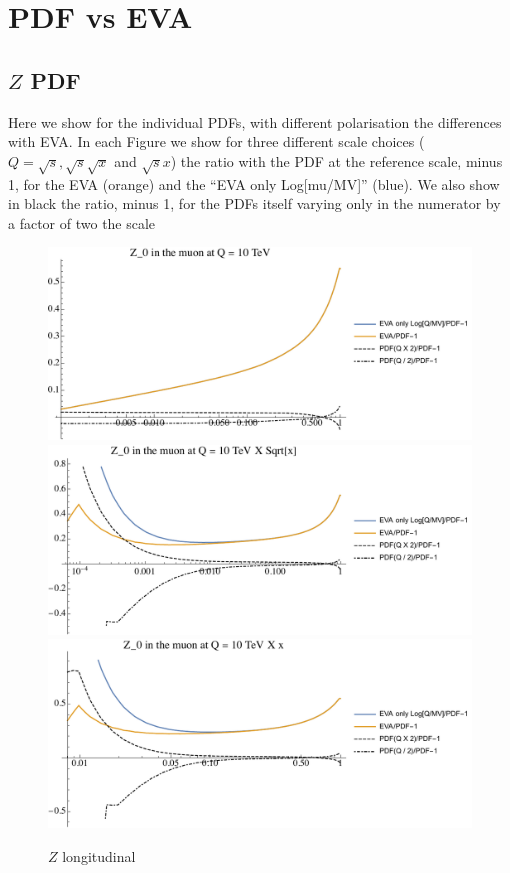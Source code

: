 \documentclass[a4paper,11pt]{article}
\begin{document}
\clearpage

\section{PDF vs EVA}
\label{app:PDFsEVA}

\subsection{$Z$ PDF}
\label{app:PDFsEVA_Z}


Here we show for the individual PDFs, with different polarisation the differences with EVA. In each Figure we show for three different scale choices ($Q=\sqrt{s}, \sqrt{s} \sqrt{x}$ and $\sqrt{s} x$) the ratio with the PDF at the reference scale, minus 1, for the EVA (orange) and the ``EVA only Log[mu/MV]'' (blue). We also show in black the ratio, minus 1, for the PDFs itself varying only in the numerator by a factor of two the scale



\begin{figure}[!b]
\includegraphics[width=0.46\linewidth]{Notebooks/PlotPDFs/ratios/10TeV/Z_0_Q.pdf}
\includegraphics[width=0.46\linewidth]{Notebooks/PlotPDFs/ratios/10TeV/Z_0_Qsqrtx.pdf}
\includegraphics[width=0.46\linewidth]{Notebooks/PlotPDFs/ratios/10TeV/Z_0_Qx.pdf}
\caption{$Z$ longitudinal}
\end{figure}
\end{document}
